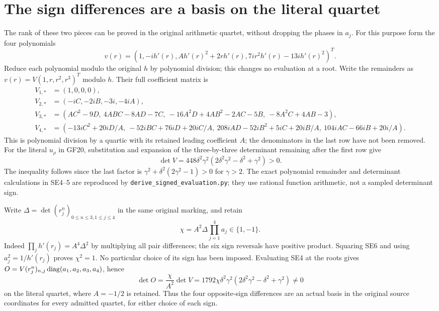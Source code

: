 \section{The sign differences are a basis on the literal quartet}
The rank of these two pieces can be proved in the original arithmetic
quartet, without dropping the phases in $a_j$. For this purpose form
the four polynomials
\[
 v(r)=(1,-ih'(r),A h'(r)^2+2rh'(r),
                         7ir^2h'(r)-13ih'(r)^2)^T.
\]
Reduce each polynomial modulo the original $h$ by polynomial division;
this changes no evaluation at a root. Write the remainders as
$v(r)=V(1,r,r^2,r^3)^T$ modulo $h$. Their full coefficient matrix is
\[
\begin{aligned}
 V_{1,*}&=(1,0,0,0),\\
 V_{2,*}&=(-iC,-2iB,-3i,-4iA),\\
 V_{3,*}&=(AC^2-9D,\ 4ABC-8AD-7C,\
             -16A^2D+4AB^2-2AC-5B,\ -8A^2C+4AB-3),\\
 V_{4,*}&=(-13iC^2+20iD/A,\ -52iBC+76iD+20iC/A,\
             208iAD-52iB^2+5iC+20iB/A,\
             104iAC-66iB+20i/A).
\end{aligned}\tag{SE4}
\]
This is polynomial division by a quartic with its retained leading
coefficient $A$; the denominators in the last row have not been removed.
For the literal $u_\rho$ in GF20, substitution and expansion of the
three-by-three determinant remaining after the first row give
\[
 \det V=448\delta^2\gamma^2
                   (2\delta^2\gamma^2-\delta^2+\gamma^2)>0.
 \tag{SE5}
\]
The inequality follows since the last factor is
$\gamma^2+\delta^2(2\gamma^2-1)>0$ for $\gamma>2$.
The exact polynomial remainder and determinant calculations in SE4--5
are reproduced by \texttt{derive\_signed\_evaluation.py}; they use
rational function arithmetic, not a sampled determinant sign.

Write $\Delta=\det(r_j^{n})_{0\le n\le3,1\le j\le4}$ in the
same original marking, and retain
\[
 \chi=A^2\Delta\prod_{j=1}^4a_j\in\{1,-1\}.
 \tag{SE6}
\]
Indeed $\prod_jh'(r_j)=A^4\Delta^2$ by multiplying all pair
differences; the six sign reversals have positive product. Squaring
SE6 and using $a_j^2=1/h'(r_j)$ proves $\chi^2=1$. No particular
choice of its sign has been imposed. Evaluating SE4 at the roots gives
$O=V(r_j^n)_{n,j}\operatorname{diag}(a_1,a_2,a_3,a_4)$, hence
\[
 \det O=\frac{\chi}{A^2}\det V
   =1792\chi\delta^2\gamma^2
                   (2\delta^2\gamma^2-\delta^2+\gamma^2)\ne0
 \tag{SE7}
\]
on the literal quartet, where $A=-1/2$ is retained. Thus the four
opposite-sign differences are an actual basis in the original source
coordinates for every admitted quartet, for either choice of each sign.

